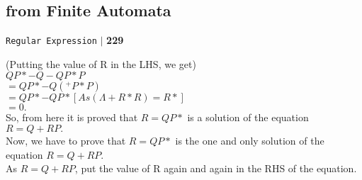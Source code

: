 \documentclass[9pt]{beamer}
\begin{document}
\begin{frame}
\section*{from Finite Automata}
\begin{flushright}
 \texttt{Regular Expression} \hspace*{0.10cm}\textbf{$|$} \textbf{229}\hspace*{0.5cm}
\end{flushright}

\vspace*{0.5cm} 
(Putting the value of R in the LHS, we get)\\

\vspace*{0.2cm}
\hspace*{4cm} $QP* - Q - QP* P$ \\
\hspace*{4cm} $= QP* - Q(^ + P* P)$ \\
\hspace*{4cm} $= QP* - QP* [As (\Lambda + R*R) = R*]$ \\
\hspace*{4cm} $= 0.$ \\

\vspace*{0.2cm}
So, from here it is proved that $R = QP*$ is a solution of the equation $R = Q + RP.$ \\
Now, we have to prove that $R = QP*$ is the one and only solution of the equation $R = Q + RP$. \\
As $R = Q + RP$, put the value of R again and again in the RHS of the equation.\\
\vspace*{0.2cm}
\end{frame}
\end{document}
